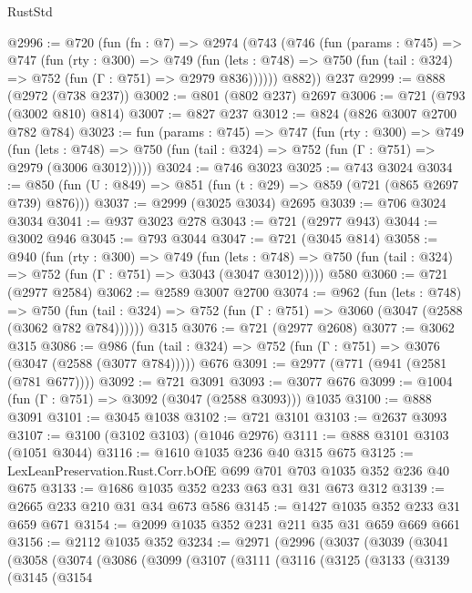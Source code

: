 \begin{lexlean}{RustStd}
\begin{coremodule}
{\begin{coremodule}
{{{{{{{{{{@2996 := @720
    (fun (fn : @7) =>
    @2974
      (@743
        (@746
          (fun (params : @745) =>
          @747
            (fun (rty : @300) =>
            @749
              (fun (lets : @748) =>
              @750 (fun (tail : @324) => @752 (fun (Γ : @751) => @2979 @836))))))
        @882))
    @237
@2999 := @888 (@2972 (@738 @237))
@3002 := @801 (@802 @237) @2697
@3006 := @721 (@793 (@3002 @810) @814)
@3007 := @827 @237
@3012 := @824 (@826 @3007 @2700 @782 @784)
@3023 := fun (params : @745) =>
  @747
    (fun (rty : @300) =>
    @749
      (fun (lets : @748) =>
      @750 (fun (tail : @324) => @752 (fun (Γ : @751) => @2979 (@3006 @3012)))))
@3024 := @746 @3023
@3025 := @743 @3024
@3034 := @850 (fun (U : @849) => @851 (fun (t : @29) => @859 (@721 (@865 @2697 @739) @876)))
@3037 := @2999 (@3025 @3034) @2695
@3039 := @706 @3024 @3034
@3041 := @937 @3023 @278
@3043 := @721 (@2977 @943)
@3044 := @3002 @946
@3045 := @793 @3044
@3047 := @721 (@3045 @814)
@3058 := @940
    (fun (rty : @300) =>
    @749
      (fun (lets : @748) =>
      @750 (fun (tail : @324) => @752 (fun (Γ : @751) => @3043 (@3047 @3012)))))
    @580
@3060 := @721 (@2977 @2584)
@3062 := @2589 @3007 @2700
@3074 := @962
    (fun (lets : @748) =>
    @750 (fun (tail : @324) => @752 (fun (Γ : @751) => @3060 (@3047 (@2588 (@3062 @782 @784))))))
    @315
@3076 := @721 (@2977 @2608)
@3077 := @3062 @315
@3086 := @986
    (fun (tail : @324) => @752 (fun (Γ : @751) => @3076 (@3047 (@2588 (@3077 @784)))))
    @676
@3091 := @2977 (@771 (@941 (@2581 (@781 @677))))
@3092 := @721 @3091
@3093 := @3077 @676
@3099 := @1004 (fun (Γ : @751) => @3092 (@3047 (@2588 @3093))) @1035
@3100 := @888 @3091
@3101 := @3045 @1038
@3102 := @721 @3101
@3103 := @2637 @3093
@3107 := @3100 (@3102 @3103) (@1046 @2976)
@3111 := @888 @3101 @3103 (@1051 @3044)
@3116 := @1610 @1035 @236 @40 @315 @675
@3125 := LexLeanPreservation.Rust.Corr.bOfE @699 @701 @703 @1035 @352 @236 @40 @675
@3133 := @1686 @1035 @352 @233 @63 @31 @31 @673 @312
@3139 := @2665 @233 @210 @31 @34 @673 @586
@3145 := @1427 @1035 @352 @233 @31 @659 @671
@3154 := @2099 @1035 @352 @231 @211 @35 @31 @659 @669 @661
@3156 := @2112 @1035 @352
@3234 := @2971
    (@2996
      (@3037
        (@3039
          (@3041
            (@3058
              (@3074
                (@3086
                  (@3099
                    (@3107
                      (@3111
                        (@3116
                          (@3125
                            (@3133
                              (@3139
                                (@3145
                                  (@3154
}}}}}}}}}}
\end{coremodule}}
\end{coremodule}
\end{lexlean}
